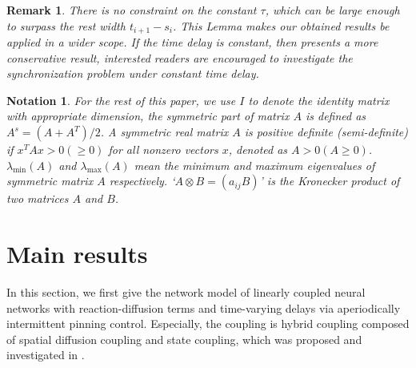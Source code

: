 \documentclass[review]{elsarticle}
\newtheorem{rem}{Remark}
\newtheorem{tion}{Notation}
\begin{document}
\begin{rem}
There is no constraint on the constant ${\tau}$, which can be large enough to surpass the rest width $t_{i+1}-s_i$. This Lemma makes our obtained results be applied in a wider scope. If the time delay is constant, then \cite{LLC15} presents a more conservative result, interested readers are encouraged to investigate the synchronization problem under constant time delay.
\end{rem}

\begin{tion}
For the rest of this paper, we use
$I$ to denote the identity matrix with appropriate dimension, the symmetric part of matrix $A$ is defined as $A^s=(A+A^T)/2$. A symmetric real matrix $A$ is positive definite
(semi-definite) if $x^T Ax>0 (\geq 0)$ for all nonzero vectors $x$, denoted as $A>0 (A\geq 0)$. $\lambda_{\min}(A)$ and $\lambda_{\max}(A)$ mean the minimum and maximum eigenvalues of symmetric matrix $A$ respectively. `$A\otimes B=(a_{ij}B)$' is the Kronecker product of two matrices $A$ and $B$.
\end{tion}




\section{Main results}\label{main}
In this section, we first give the network model of linearly coupled neural networks with reaction-diffusion terms and time-varying delays via aperiodically intermittent pinning control. Especially, the coupling is hybrid coupling composed of spatial diffusion coupling and state coupling, which was proposed and investigated in \cite{WW2014,WWHR2016}.
\end{document}
